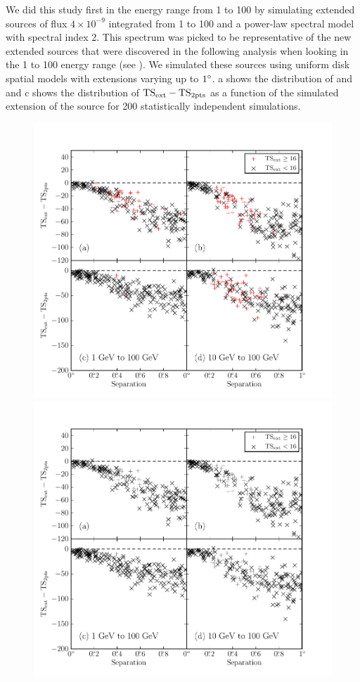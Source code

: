 We did this study first in the energy range from 1 \gev to 100 \gev by
simulating extended sources of flux $4\times10^{-9}$ \fluxunits integrated
from 1 \gev to 100 \gev and a power-law spectral model with
spectral index 2.  This spectrum was picked to be representative of the
new extended sources that were discovered in the following analysis
when looking in the 1 \gev to 100 \gev energy range
(see ).
We simulated these sources using uniform disk spatial models
with extensions varying
up to $1^\circ$.  
a shows the distribution
of \tsext and \tsinc and 
c shows 
the distribution of $\mathrm{TS}_\mathrm{ext}-\mathrm{TS}_{\mathrm{2pts}}$ as a
function of the simulated extension of the source
for 200 statistically independent simulations.


\begin{figure}[htbp]
    \ifcolorfigure
    \includegraphics{chapters/extended_analysis/figures/mc_plots/confusion_2pts_plot_color.pdf}
    \else
    \includegraphics{chapters/extended_analysis/figures/mc_plots/confusion_2pts_plot_bw.pdf}

\end{figure}
